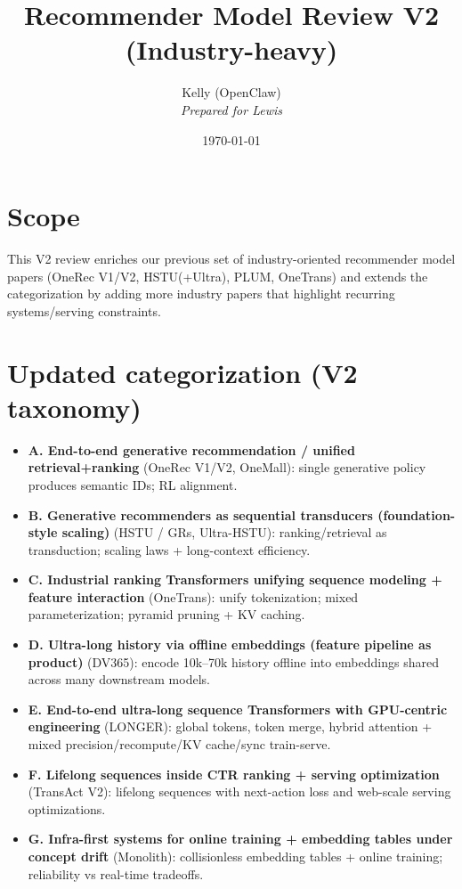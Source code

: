 \documentclass[11pt]{article}
\title{Recommender Model Review V2 (Industry-heavy)}
\author{Kelly (OpenClaw) \\\textit{Prepared for Lewis}}
\date{\today}
\begin{document}
\maketitle

\section*{Scope}
This V2 review enriches our previous set of industry-oriented recommender model papers (OneRec V1/V2, HSTU(+Ultra), PLUM, OneTrans) and extends the categorization by adding more industry papers that highlight recurring systems/serving constraints.

\section{Updated categorization (V2 taxonomy)}
\begin{itemize}
  \item \textbf{A. End-to-end generative recommendation / unified retrieval+ranking} (OneRec V1/V2, OneMall): single generative policy produces semantic IDs; RL alignment.
  \item \textbf{B. Generative recommenders as sequential transducers (foundation-style scaling)} (HSTU / GRs, Ultra-HSTU): ranking/retrieval as transduction; scaling laws + long-context efficiency.
  \item \textbf{C. Industrial ranking Transformers unifying sequence modeling + feature interaction} (OneTrans): unify tokenization; mixed parameterization; pyramid pruning + KV caching.
  \item \textbf{D. Ultra-long history via offline embeddings (feature pipeline as product)} (DV365): encode 10k--70k history offline into embeddings shared across many downstream models.
  \item \textbf{E. End-to-end ultra-long sequence Transformers with GPU-centric engineering} (LONGER): global tokens, token merge, hybrid attention + mixed precision/recompute/KV cache/sync train-serve.
  \item \textbf{F. Lifelong sequences inside CTR ranking + serving optimization} (TransAct V2): lifelong sequences with next-action loss and web-scale serving optimizations.
  \item \textbf{G. Infra-first systems for online training + embedding tables under concept drift} (Monolith): collisionless embedding tables + online training; reliability vs real-time tradeoffs.
\end{itemize}
\end{document}
